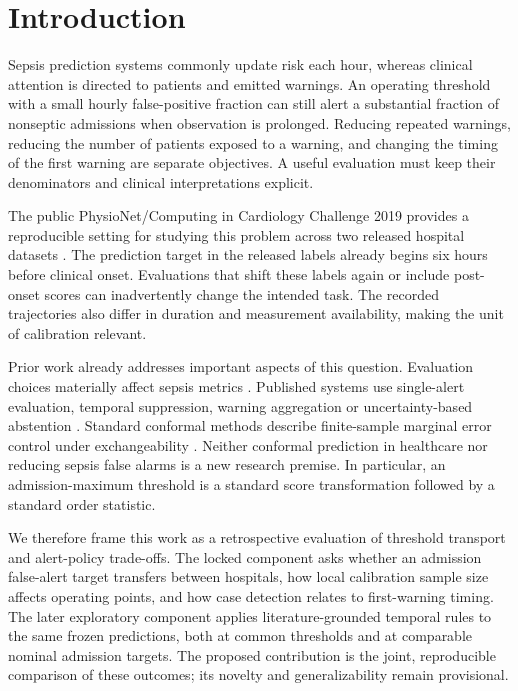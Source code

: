 \documentclass[11pt,a4paper]{article}
\begin{document}
\section{Introduction}
Sepsis prediction systems commonly update risk each hour, whereas clinical attention is directed to patients and emitted warnings. An operating threshold with a small hourly false-positive fraction can still alert a substantial fraction of nonseptic admissions when observation is prolonged. Reducing repeated warnings, reducing the number of patients exposed to a warning, and changing the timing of the first warning are separate objectives. A useful evaluation must keep their denominators and clinical interpretations explicit.

The public PhysioNet/Computing in Cardiology Challenge 2019 provides a reproducible setting for studying this problem across two released hospital datasets \cite{reyna,reynadata}. The prediction target in the released labels already begins six hours before clinical onset. Evaluations that shift these labels again or include post-onset scores can inadvertently change the intended task. The recorded trajectories also differ in duration and measurement availability, making the unit of calibration relevant.

Prior work already addresses important aspects of this question. Evaluation choices materially affect sepsis metrics \cite{do}. Published systems use single-alert evaluation, temporal suppression, warning aggregation or uncertainty-based abstention \cite{moor,composer,gupta}. Standard conformal methods describe finite-sample marginal error control under exchangeability \cite{angelopoulos}. Neither conformal prediction in healthcare nor reducing sepsis false alarms is a new research premise. In particular, an admission-maximum threshold is a standard score transformation followed by a standard order statistic.

We therefore frame this work as a retrospective evaluation of threshold transport and alert-policy trade-offs. The locked component asks whether an admission false-alert target transfers between hospitals, how local calibration sample size affects operating points, and how case detection relates to first-warning timing. The later exploratory component applies literature-grounded temporal rules to the same frozen predictions, both at common thresholds and at comparable nominal admission targets. The proposed contribution is the joint, reproducible comparison of these outcomes; its novelty and generalizability remain provisional.
\end{document}
